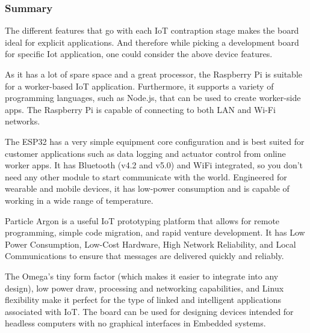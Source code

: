 \documentclass[a4paper,11pt]{article}
\begin{document}
\begin{iotsolution}
\begin{center}
\end{center}
\subsubsection*{Summary}
The different features that go with each IoT contraption stage makes the board ideal for explicit applications. And therefore while picking a development board for specific Iot application, one could consider the above device features.

As it has a lot of spare space and a great processor, the Raspberry Pi is suitable for a worker-based IoT application. Furthermore, it supports a variety of programming languages, such as Node.js, that can be used to create worker-side apps. The Raspberry Pi is capable of connecting to both LAN and Wi-Fi networks.\cite{tewari2021comparative}

The ESP32 has a very simple equipment core configuration and is best suited for customer applications such as data logging and actuator control from online worker apps. It has Bluetooth (v4.2 and v5.0) and WiFi integrated, so you don’t need any other module to start communicate with the world. Engineered for wearable and mobile devices, it has low-power consumption and is capable of working in a wide range of temperature.

Particle Argon is a useful IoT prototyping platform that allows for remote programming, simple code migration, and rapid venture development. It has Low Power Consumption, Low-Cost Hardware, High Network Reliability, and Local Communications to ensure that messages are delivered quickly and reliably.\cite{tewari2021comparative}

The Omega's tiny form factor (which makes it easier to integrate into any design), low power draw, processing and networking capabilities, and Linux flexibility make it perfect for the type of linked and intelligent applications associated with IoT. The board can be used for designing devices intended for headless computers with no graphical interfaces in Embedded systems.


\end{iotsolution}
\end{document}

